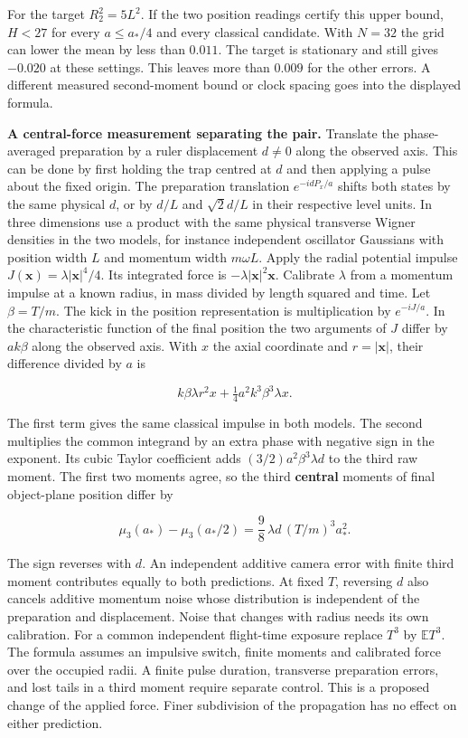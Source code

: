\documentclass[11pt,a4paper]{article}
\begin{document}
For the target \(R_2^2=5L^2\). If the two position readings certify this
upper bound, \(H<27\) for every \(a\le a_*/4\) and every classical
candidate. With \(N=32\) the grid can lower the mean by less than
\(0.011\). The target is stationary and still gives \(-0.020\) at these
settings. This leaves more than \(0.009\) for the other errors. A
different measured second-moment bound or clock spacing goes into the
displayed formula.

\textbf{A central-force measurement separating the pair.} Translate the
phase-averaged preparation by a ruler displacement \(d\ne0\) along the
observed axis. This can be done by first holding the trap centred at
\(d\) and then applying a pulse about the fixed origin. The preparation
translation \(e^{-id P_x/a}\) shifts both states by the same physical
\(d\), or by \(d/L\) and \(\sqrt{2}d/L\) in their respective level
units. In three dimensions use a product with the same physical
transverse Wigner densities in the two models, for instance independent
oscillator Gaussians with position width \(L\) and momentum width
\(m\omega L\). Apply the radial potential impulse
\(J(\mathbf x)=\lambda|\mathbf x|^4/4\). Its integrated force is
\(-\lambda|\mathbf x|^2\mathbf x\). Calibrate \(\lambda\) from a
momentum impulse at a known radius, in mass divided by length squared
and time. Let \(\beta=T/m\). The kick in the position representation is
multiplication by \(e^{-iJ/a}\). In the characteristic function of the
final position the two arguments of \(J\) differ by \(ak\beta\) along
the observed axis. With \(x\) the axial coordinate and
\(r=|\mathbf x|\), their difference divided by \(a\) is

\[
 k\beta\lambda r^2 x+\tfrac14 a^2k^3\beta^3\lambda x .
\]

The first term gives the same classical impulse in both models. The
second multiplies the common integrand by an extra phase with negative
sign in the exponent. Its cubic Taylor coefficient adds
\((3/2)a^2\beta^3\lambda d\) to the third raw moment. The first two
moments agree, so the third \textbf{central} moments of final
object-plane position differ by

\[
 \mu_3(a_*)-\mu_3(a_*/2)=\frac98\,\lambda d\,(T/m)^3 a_*^2 .
\]

The sign reverses with \(d\). An independent additive camera error with
finite third moment contributes equally to both predictions. At fixed
\(T\), reversing \(d\) also cancels additive momentum noise whose
distribution is independent of the preparation and displacement. Noise
that changes with radius needs its own calibration. For a common
independent flight-time exposure replace \(T^3\) by \(\mathbb E T^3\).
The formula assumes an impulsive switch, finite moments and calibrated
force over the occupied radii. A finite pulse duration, transverse
preparation errors, and lost tails in a third moment require separate
control. This is a proposed change of the applied force. Finer
subdivision of the propagation has no effect on either prediction.
\end{document}

